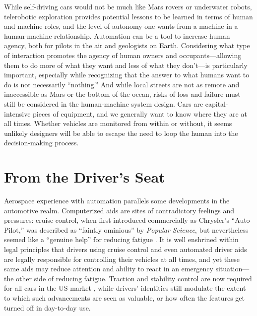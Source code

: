While self-driving cars would not
be much like Mars rovers or underwater robots, telerobotic exploration
provides potential lessons
to be learned in terms of human and machine roles, and the level of
autonomy one wants from a machine in a human-machine relationship.
Automation can be a tool to increase 
human agency, both for pilots in the air and geologists on Earth.
Considering what type of interaction promotes the agency
of human owners and occupants---allowing them to do more of what they
want and less of what they don't---is particularly important,
especially while recognizing that the answer to what humans want to do
is not necessarily ``nothing.'' And while local streets are not as
remote and inaccessible as Mars or the bottom of the ocean, risks of
loss and failure must still be considered in the human-machine system
design. Cars are capital-intensive pieces of equipment, and we
generally want to know where they are at all times. Whether vehicles
are monitored
from within or without, it seems unlikely designers will be able to
escape the need to loop the human into the decision-making process.


\section{From the Driver's Seat}

Aerospace experience with automation parallels some developments
in the automotive realm. Computerized aids are sites of contradictory
feelings and pressures: 
cruise control, when first introduced commercially as Chrysler's ``Auto-Pilot,''
was described as ``faintly
ominious'' by \emph{Popular Science}, but nevertheless seemed like a
``genuine help'' for reducing
fatigue \cite{rowsomePopsci}.
It is well enshrined within legal principles that drivers using
cruise control and even automated driver aids are legally responsible
for controlling their vehicles at all times, and yet these same aids
may reduce attention and ability to react in an emergency
situation---the other side of reducing fatigue.
Traction and stability control are now required for all cars in the US
market \cite{brookingsLiability}, while drivers' identities still modulate the
extent to which such
advancements are seen as valuable, or how often the features get
turned off in day-to-day use. 

